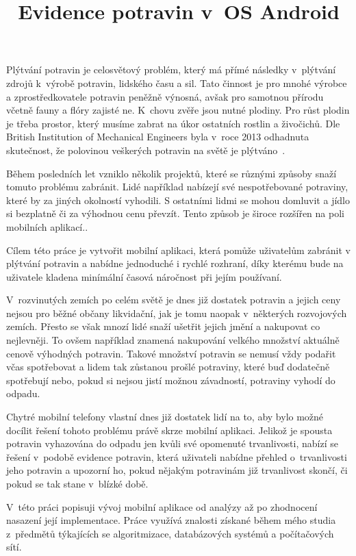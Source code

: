 \documentclass[thesis=B,czech]{FITthesis}[2013/10/20]
\title{Evidence potravin v~OS Android}
\begin{document}

\begin{introduction}

Plýtvání potravin je celosvětový problém, který má přímé následky v~plýtvání zdrojů k~výrobě potravin, lidského času a sil. Tato činnost je pro mnohé výrobce a zprostředkovatele potravin peněžně výnosná, avšak pro samotnou přírodu včetně fauny a flóry zajisté ne. K~chovu zvěře jsou nutné plodiny. Pro růst plodin je třeba prostor, který musíme zabrat na úkor ostatních rostlin a živočichů. Dle British Institution of Mechanical Engineers byla v~roce 2013 odhadnuta skutečnost, že polovinou veškerých potravin na světě je plýtváno~\cite{fakta}.

Během posledních let vzniklo několik projektů, které se různými způsoby snaží tomuto problému zabránit. Lidé například nabízejí své nespotřebované potraviny, které by za jiných okolností vyhodili. S ostatními lidmi se mohou domluvit a jídlo si bezplatně či za výhodnou cenu převzít. Tento způsob je široce rozšířen na poli mobilních aplikací..

Cílem této práce je vytvořit mobilní aplikaci, která pomůže uživatelům zabránit v plýtvání potravin a nabídne jednoduché i rychlé rozhraní, díky kterému bude na uživatele kladena minímální časová náročnost při jejím používaní.

V~rozvinutých zemích po celém světě je dnes již dostatek potravin a jejich ceny nejsou pro běžné občany likvidační, jak je tomu naopak v~některých rozvojových zemích. Přesto se však mnozí lidé snaží ušetřit jejich jmění a nakupovat co nejlevněji. To ovšem například znamená nakupování velkého množství aktuálně cenově výhodných potravin. Takové množství potravin se nemusí vždy podařit včas spotřebovat a lidem tak zůstanou prošlé potraviny, které buď dodatečně spotřebují nebo, pokud si nejsou jistí možnou závadností, potraviny vyhodí do odpadu.

Chytré mobilní telefony vlastní dnes již dostatek lidí na to, aby bylo možné docílit řešení tohoto problému právě skrze mobilní aplikaci. Jelikož je spousta potravin vyhazována do odpadu jen kvůli své opomenuté trvanlivosti, nabízí se řešení v~podobě evidence potravin, která uživateli nabídne přehled o~trvanlivosti jeho potravin a upozorní ho, pokud nějakým potravinám již trvanlivost skončí, či pokud se tak stane v~blízké době.

V~této práci popisuji vývoj mobilní aplikace od analýzy až po zhodnocení nasazení její implementace. Práce využívá znalosti získané během mého studia z~předmětů týkajících se algoritmizace, databázových systémů a počítačových sítí.

\end{introduction}
\end{document}
